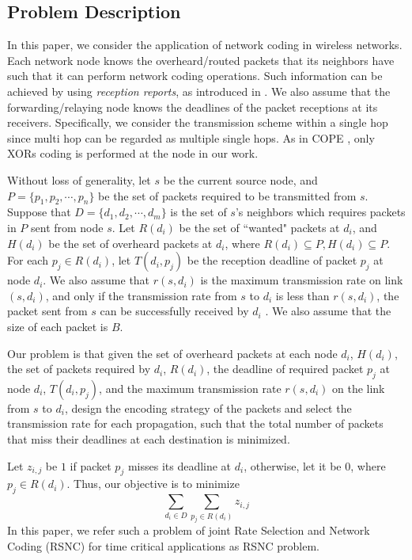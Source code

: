 \documentclass[journal]{IEEEtran}
\begin{document}
\subsection{Problem Description}\vspace{-0.02in}
In this paper, we consider the application of network coding in wireless networks. Each network node knows the overheard/routed packets that its neighbors have such that it can perform network coding operations. Such information can be achieved by using {\em reception reports}, as introduced in \cite{KRH+2008XORs510}. We also assume that the forwarding/relaying node knows the deadlines of the packet receptions at its receivers. Specifically, we consider the transmission scheme within a single hop since multi hop can be regarded as multiple single hops. As in COPE \cite{KRH+2008XORs510}, only XORs coding is performed at the node in our work.

Without loss of generality, let $s$ be the current source node, and $P=\{p_1,p_2,\cdots,p_n\}$ be the set of packets required to be transmitted from $s$. Suppose that $D=\{d_1,d_2,\cdots,d_m\}$ is the set of $s$'s neighbors which requires packets in $P$ sent from node $s$. Let $R(d_i)$ be the set of ``wanted" packets at $d_i$, and $H(d_i)$ be the set of overheard packets at $d_i$, where $R(d_i)\subseteq P,H(d_i)\subseteq P$. For each $p_j\in R(d_i)$, let $T(d_i,p_j)$ be the reception deadline of packet $p_j$ at node $d_i$. We also assume that $r(s,d_i)$ is the maximum transmission rate on link $(s,d_i)$, and only if the transmission rate from $s$ to $d_i$ is less than $r(s,d_i)$, the packet sent from $s$ can be successfully received by $d_i$ \cite{KV2009Is646}. We also assume that the size of each packet is $B$.

Our problem is that given the set of overheard packets at each node $d_i$, $H(d_i)$, the set of packets required by $d_i$, $R(d_i)$, the deadline of required packet $p_j$ at node $d_i$, $T(d_i,p_j)$, and the maximum transmission rate $r(s,d_i)$ on the link from $s$ to $d_i$, design the encoding strategy of the packets and select the transmission rate for each propagation, such that the total number of packets that miss their deadlines at each destination is minimized.

Let $z_{i,j}$ be $1$ if packet $p_j$ misses its deadline at $d_i$, otherwise, let it be $0$, where $p_j\in R(d_i)$. Thus, our objective is to minimize
$$\sum_{d_i\in D}\sum_{p_j\in R(d_i)}z_{i,j}$$ In this paper, we refer such a problem of joint Rate Selection and Network Coding (RSNC) for time critical applications as RSNC problem.
\end{document}
